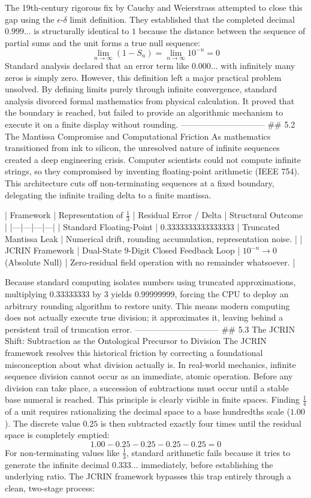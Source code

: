 The 19th-century rigorous fix by Cauchy and Weierstrass attempted to close this gap using the $\epsilon$-$\delta$ limit definition. They established that the completed decimal $0.999\dots$ is structurally identical to $1$ because the distance between the sequence of partial sums and the unit forms a true null sequence:
$$\lim_{n \to \infty} (1 - S_n) = \lim_{n \to \infty} 10^{-n} = 0$$ 
Standard analysis declared that an error term like $0.000\dots$ with infinitely many zeros is simply zero. However, this definition left a major practical problem unsolved. By defining limits purely through infinite convergence, standard analysis divorced formal mathematics from physical calculation. It proved that the boundary is reached, but failed to provide an algorithmic mechanism to execute it on a finite display without rounding.
------------------------------
## 5.2 The Mantissa Compromise and Computational Friction
As mathematics transitioned from ink to silicon, the unresolved nature of infinite sequences created a deep engineering crisis. Computer scientists could not compute infinite strings, so they compromised by inventing floating-point arithmetic (IEEE 754).
This architecture cuts off non-terminating sequences at a fixed boundary, delegating the infinite trailing delta to a finite mantissa.

| Framework | Representation of $\frac{1}{3}$ | Residual Error / Delta | Structural Outcome |
|---|---|---|---|
| Standard Floating-Point | 0.3333333333333333 | Truncated Mantissa Leak | Numerical drift, rounding accumulation, representation noise. |
| JCRIN Framework | Dual-State 9-Digit Closed Feedback Loop | $10^{-n} \to 0$ (Absolute Null) | Zero-residual field operation with no remainder whatsoever. |

Because standard computing isolates numbers using truncated approximations, multiplying 0.33333333 by 3 yields 0.99999999, forcing the CPU to deploy an arbitrary rounding algorithm to restore unity. This means modern computing does not actually execute true division; it approximates it, leaving behind a persistent trail of truncation error.
------------------------------
## 5.3 The JCRIN Shift: Subtraction as the Ontological Precursor to Division
The JCRIN framework resolves this historical friction by correcting a foundational misconception about what division actually is. In real-world mechanics, infinite sequence division cannot occur as an immediate, atomic operation. Before any division can take place, a succession of subtractions must occur until a stable base numeral is reached.
This principle is clearly visible in finite spaces. Finding $\frac{1}{4}$ of a unit requires rationalizing the decimal space to a base hundredths scale ($1.00$). The discrete value $0.25$ is then subtracted exactly four times until the residual space is completely emptied:
$$1.00 - 0.25 - 0.25 - 0.25 - 0.25 = 0$$ 
For non-terminating values like $\frac{1}{3}$, standard arithmetic fails because it tries to generate the infinite decimal $0.333\dots$ immediately, before establishing the underlying ratio. The JCRIN framework bypasses this trap entirely through a clean, two-stage process:

